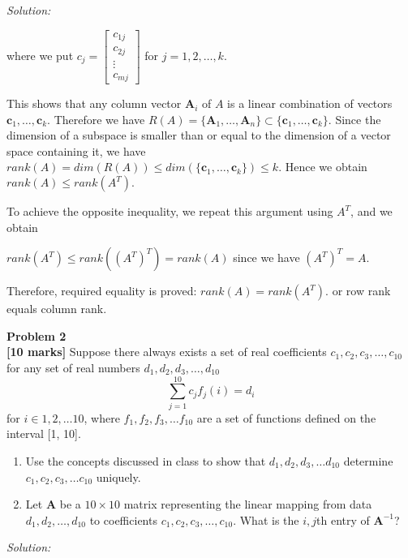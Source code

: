 \documentclass[fleqn]{article}
\newenvironment{problem}[2][Problem]
    { \begin{mdframed}[backgroundcolor=gray!20] \textbf{#1 #2} \\}
    {  \end{mdframed}}
\newenvironment{solution}
    {\textit{Solution:}}
    {}
\begin{document}
\begin{solution}
\begin{enumerate}[label=(\alph*)]
    where we put
    $c_j=\begin{bmatrix} 
      c_{1j} \\ 
       c_{2j} \\ 
        \vdots \\ 
       c_{mj} 
       \end{bmatrix}$
    for $j=1,2,\dots,k$.
    
    This shows that any column vector $\mathbf{A}_i$ of $A$ is a linear combination of vectors $\mathbf{c}_1, \dots, \mathbf{c}_k$. Therefore we have
    $R(A)=\{\mathbf{A}_1, \dots, \mathbf{A}_n\} \subset \{\mathbf{c}_1, \dots, \mathbf{c}_k\}$.
    Since the dimension of a subspace is smaller than or equal to the dimension of a vector space containing it, we have
    $rank(A)=dim(R(A)) \leq dim(\{\mathbf{c}_1, \dots, \mathbf{c}_k\}) \leq k.$
    Hence we obtain
    $rank(A) \leq rank(A^{T}).$
    
    To achieve the opposite inequality, we repeat this argument using $A^{T}$, and we obtain

    $rank(A^{T}) \leq rank((A^{T})^{T})=rank(A)$
    since we have $(A^{T})^{T}=A.$
    
    Therefore, required equality is proved: 
    $rank(A)=rank(A^{T}).$ or row rank equals column rank.
    \end{enumerate}
\end{solution}

\newpage
\begin{problem}{2}
\textbf{[10 marks]} Suppose there always exists a set of real coefficients $c_1, c_2, c_3, \dots, c_{10}$ for any set of real numbers $d_1, d_2, d_3, \dots, d_{10}$
\begin{equation*}
    \sum_{j=1}^{10} c_j f_j(i) = d_i
\end{equation*}
for $i \in {1,2,\dots 10}$, where $f_1, f_2, f_3, \dots f_{10}$ are a set of functions defined on the interval [1, 10].
\begin{enumerate}[label=(\alph*)]
    \item Use the concepts discussed in class to show that $d_1, d_2, d_3, \dots d_{10}$ determine $c_1, c_2, c_3, \dots c_{10}$ uniquely.
    \item Let \textbf{A} be a $10 \times 10$ matrix representing the linear mapping from data $d_1, d_2, \dots, d_10$ to coefficients $c_1, c_2, c_3, \dots, c_{10}$. What is the $i,j$th entry of $\textbf{A}^{-1}$?
\end{enumerate}
\end{problem}
\begin{solution}
\end{solution}
\end{document}
